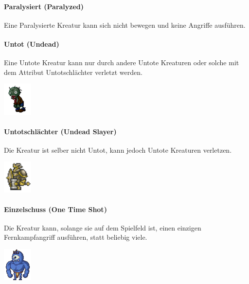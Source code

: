 \documentclass[a4paper,12pt]{scrartcl}
\begin{document}
	\paragraph{Paralysiert (\glqq Paralyzed\grqq\hspace{0.05em})}
	Eine Paralysierte Kreatur kann sich nicht bewegen und keine Angriffe ausführen.
	
	\paragraph{Untot (\glqq Undead\grqq\hspace{0.05em})}
	Eine Untote Kreatur kann nur durch andere Untote Kreaturen oder solche mit dem Attribut Untotschlächter verletzt werden.\\
	\begin{center}\includegraphics{Prog2_EA_V2/Art/Zombie.png}\end{center}
	
	\paragraph{Untotschlächter (\glqq Undead Slayer\grqq\hspace{0.05em})}
	Die Kreatur ist selber nicht Untot, kann jedoch Untote Kreaturen verletzen.\\
	\begin{center}\includegraphics{Prog2_EA_V2/Art/Paladin.png}\end{center}
	
	\paragraph{Einzelschuss (\glqq One Time Shot\grqq\hspace{0.05em})}
	Die Kreatur kann, solange sie auf dem Spielfeld ist, einen einzigen Fernkampfangriff ausführen, statt beliebig viele.\\
	\begin{center}\includegraphics{Prog2_EA_V2/Art/Giant.png}\end{center}
	
\end{document}
